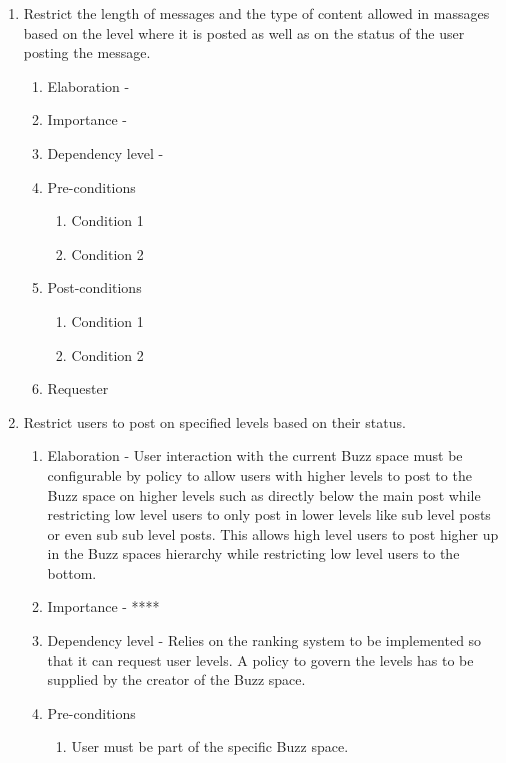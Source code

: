 \documentclass[12pt]{article}
\begin{document}
\begin{enumerate}
\newpage %
  \item Restrict the length of messages and the type of content allowed in massages based
on the level where it is posted as well as on the status of the user posting the
message.  %
  \begin{enumerate}
    \item Elaboration - 
    \item Importance - 
    \item Dependency level - 
    \item Pre-conditions
    \begin{enumerate}
    	\item Condition 1
    	\item Condition 2
    \end{enumerate}
        \item Post-conditions
    \begin{enumerate}
    	\item Condition 1
    	\item Condition 2
    \end{enumerate}
    \item Requester
  \end{enumerate}
\newpage %
   \item Restrict users to post on specified levels based on their status. %
  \begin{enumerate}
    \item Elaboration - User interaction with the current Buzz space must be configurable by policy to allow users with higher levels to post to the Buzz space on higher levels such as directly below the main post while restricting low level users to only post in lower levels like sub level posts or even sub sub level posts. This allows high level users to post higher up in the Buzz spaces hierarchy while restricting low level users to the bottom. 
    \item Importance - ****
    \item Dependency level - Relies on the ranking system to be implemented so that it can request user levels. A policy to govern the levels has to be supplied by the creator of the Buzz space.
    \item Pre-conditions
    \begin{enumerate}
    	\item User must be part of the specific Buzz space.

\end{enumerate}
\end{enumerate}
\end{enumerate}
\end{document}
